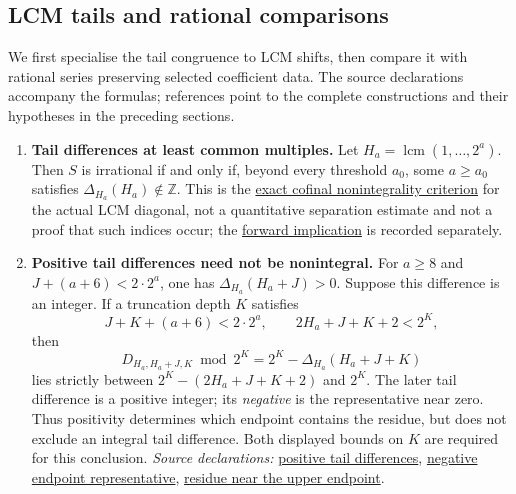 \documentclass[11pt]{article}
\theoremstyle{plain}
\theoremstyle{definition}
\theoremstyle{remark}
\newcommand{\commit}{99f4bf47422abbd8757cbb22b50ba079d764d3a7}
\newcommand{\repobase}{https://github.com/wcook04/plectis-erdos/blob/\commit}
\newcommand{\Z}{\mathbb{Z}}
\newcommand{\lcm}{\operatorname{lcm}}
\newcommand{\mword}[4]{\href{\repobase/#1\#L#2}{#4}}
\begin{document}
\subsection{LCM tails and rational comparisons}\label{long249:r3-comparisons}
We first specialise the tail congruence to LCM shifts, then compare
it with rational series preserving selected coefficient data. The
source declarations accompany the formulas; references point to the
complete constructions and their hypotheses in the preceding sections.

\begin{enumerate}
\item\label{res:actualorbit}
\textbf{Tail differences at least common multiples.}  Let
$H_a=\lcm(1,\ldots,2^a)$. Then $S$ is irrational if and only if,
beyond every threshold $a_0$, some $a\ge a_0$ satisfies
$\Delta_{H_a}(H_a)\notin\Z$.  This is the
\mword{Erdos249257/TotientActualLcmOrbitNonintegrality.lean}{37}{irrational_totientSeries_iff_actualLcmOrbitNonintegralitySupply}{exact cofinal nonintegrality criterion}
for the actual LCM diagonal, not a quantitative
separation estimate and not a proof that such indices occur; the
\mword{Erdos249257/TotientActualLcmOrbitNonintegrality.lean}{53}{irrational_totientSeries_of_actualLcmOrbitNonintegralitySupply}{forward implication}
is recorded separately.

\item\label{res:actualsign}
\textbf{Positive tail differences need not be nonintegral.} For $a\ge8$ and
$J+(a+6)<2\cdot2^a$, one has $\Delta_{H_a}(H_a+J)>0$.
Suppose this difference is an integer. If a truncation depth $K$ satisfies
\[
 J+K+(a+6)<2\cdot2^a,
 \qquad 2H_a+J+K+2<2^K,
\]
then
\[
 D_{H_a,H_a+J,K}\bmod2^K
   =2^K-\Delta_{H_a}(H_a+J+K)
\]
lies strictly between $2^K-(2H_a+J+K+2)$ and $2^K$.
The later tail difference is a positive integer; its \emph{negative} is
the representative near zero. Thus positivity determines which endpoint
contains the residue, but does not exclude an integral tail difference.
Both displayed bounds on $K$ are required for this conclusion.
{\footnotesize\emph{Source declarations:}
\mword{Erdos249257/TotientActualLcmOrbitSign.lean}{39}{actualLcmTailDiff_shift_pos}{positive tail differences},
\mword{Erdos249257/TotientActualLcmOrbitSign.lean}{172}{actualLcm_trueEndpointSurvivor_neg}{negative endpoint representative},
\mword{Erdos249257/TotientActualLcmOrbitSign.lean}{211}{actualLcm_integral_forces_topEdgeResidue}{residue near the upper endpoint}.}


\end{enumerate}
\end{document}

